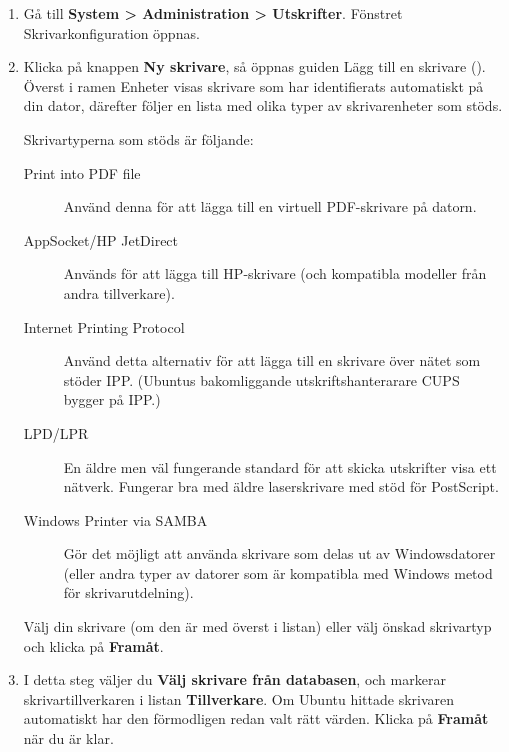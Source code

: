 \documentclass[a4paper,final]{memoir} %
\begin{document}
\begin{enumerate}

\item Gå till \textbf{System \textgreater{} Administration \textgreater{} Utskrifter}. Fönstret Skrivarkonfiguration öppnas.


\item Klicka på knappen \textbf{Ny skrivare}, så öppnas guiden Lägg till en skrivare (). Överst i ramen Enheter visas skrivare som har identifierats automatiskt på din dator, därefter följer en lista med olika typer av skrivarenheter som stöds.

Skrivartyperna som stöds är följande:

\begin{description}

\item[Print into PDF file] Använd denna för att lägga till en virtuell PDF-skrivare på datorn. 

\item[AppSocket/HP JetDirect] Används för att lägga till HP-skrivare (och kompatibla modeller från andra tillverkare).

\item[Internet Printing Protocol] Använd detta alternativ för att lägga till en skrivare över nätet  som stöder IPP. (Ubuntus bakomliggande utskriftshanterarare CUPS bygger på IPP.)

\item[LPD/LPR] En äldre men väl fungerande standard för att skicka utskrifter visa ett nätverk. Fungerar bra med äldre laserskrivare med stöd för PostScript.

\item[Windows Printer via SAMBA] Gör det möjligt att använda skrivare som delas ut av Windowsdatorer (eller andra typer av datorer som är kompatibla med Windows metod för skrivarutdelning).

\end{description}

Välj din skrivare (om den är med överst i listan) eller välj önskad skrivartyp och klicka på \textbf{Framåt}.

\item I detta steg väljer du \textbf{Välj skrivare från databasen}, och markerar skrivartillverkaren i listan \textbf{Tillverkare}. Om Ubuntu hittade skrivaren automatiskt har den förmodligen redan valt rätt värden. Klicka på \textbf{Framåt} när du är klar.


\end{enumerate}
\end{document}
